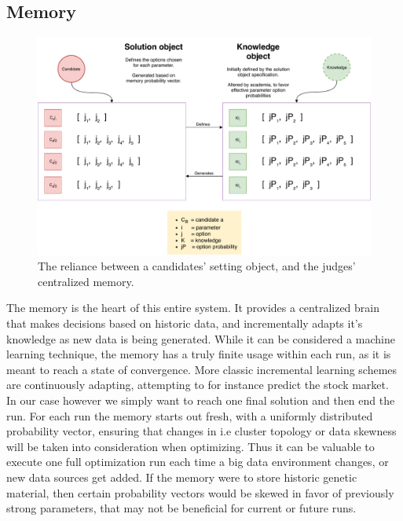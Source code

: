 \documentclass[a4paper,english]{report}
\begin{document}
		\subsection{Memory}
		\label{memory}
		\begin{figure}[h]
			\includegraphics[width=\textwidth]{memory_candidate}
			\caption{The reliance between a candidates' setting object, and the judges' centralized memory.}
		\end{figure}
		The memory is the heart of this entire system. It provides a centralized brain that makes decisions based on historic data, and incrementally adapts it's knowledge as new data is being generated. While it can be considered a machine learning technique, the memory has a truly finite usage within each run, as it is meant to reach a state of convergence. More classic incremental learning schemes are continuously adapting, attempting to for instance predict the stock market. In our case however we simply want to reach one final solution and then end the run. For each run the memory starts out fresh, with a uniformly distributed probability vector, ensuring that changes in i.e cluster topology or data skewness will be taken into consideration when optimizing. Thus it can be valuable to execute one full optimization run each time a big data environment changes, or new data sources get added. If the memory were to store historic genetic material, then certain probability vectors would be skewed in favor of previously strong parameters, that may not be beneficial for current or future runs.
		\clearpage
\end{document}
